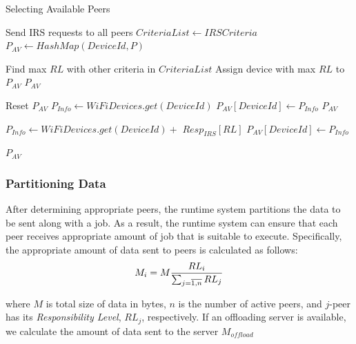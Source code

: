 \documentclass{sig-alternate}
\begin{document}
\begin{algorithm}
\caption{Selecting Available Peers}
\label{alg:select_peers}
\begin{algorithmic}[1] 
\begin{scriptsize}
\State Send IRS requests to all peers 
\State $CriteriaList \leftarrow IRSCriteria$
\State $P_{AV} \leftarrow HashMap(DeviceId, P)$

  	\State Find max $RL$ with other criteria in $CriteriaList$
		\State Assign device with max $RL$ to $P_{AV}$
  	\State \Return $P_{AV}$
  \EndFor
\EndIf

  	\State Reset $P_{AV}$ 
  	\State $P_{Info} \leftarrow WiFiDevices.get(DeviceId)$
  	\State $P_{AV}[DeviceId] \leftarrow P_{Info}$
  	\State \Return $P_{AV}$
  \EndIf

  	\State $P_{Info} \leftarrow WiFiDevices.get(DeviceId) + $
		\State
			\hspace{\algorithmicindent}
			\hspace{\algorithmicindent}
			\hspace{\algorithmicindent}
			\hspace{\algorithmicindent}
			$Resp_{IRS}[RL]$
  	\State $P_{AV}[DeviceId] \leftarrow P_{Info}$
  \EndIf
\EndFor

\State \Return $P_{AV}$
\EndFunction
\end{scriptsize}
\end{algorithmic}

\end{algorithm}

\subsubsection{Partitioning Data}\label{ss_jqfp}
After determining appropriate peers, the runtime system partitions the data to be sent along with a job. As a result, the runtime system can ensure that each peer receives appropriate amount of job that is suitable to execute. Specifically, the appropriate amount of data sent to peers is calculated as follows:
\begin{equation} 
\label{eq:data_amount} \small
M_{i} = M\frac{RL_{i}}{\sum_{j = \overline{1,n}}{RL_{j}}}
\end{equation}

\noindent 
where $M$ is total size of data in bytes, $n$ is the number of active peers, and $j$-peer has its \emph{Responsibility Level}, $RL_{j}$, respectively. If an offloading server is available, we calculate the amount of data sent to the server $M_{offload}$
\end{document}
